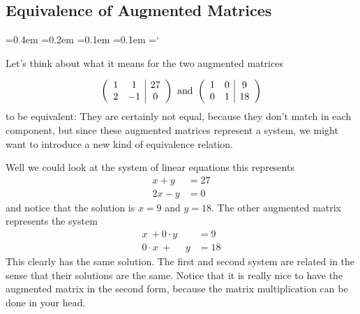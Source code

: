 \subsection*{Equivalence of Augmented Matrices}

{\ttfamily
{}\font=0.4em
\font=0.2em
\font=0.1em
\font=0.1em
\hyphenchar\font=`\-


\hypertarget{script_gaussian_elimination_background}{Let's think about what it means for the two augmented matrices} 
\[ \left( \begin{array}{cc | c}
1 & 1 & 27 \\
2 & -1 & 0  
\end{array} \right)
\mbox{ and } \left( \begin{array}{cc | c}
1 & 0 & 9 \\
0 & 1 & 18  
\end{array} \right)
\]
to be equivalent:
They are certainly not equal, because they don't match in each component, but since these augmented matrices represent a system, we might want to introduce a new kind of equivalence relation.

Well we could look at the system of linear equations this represents 
\begin{align*}
 x+y &= 27\\
 2x - y &= 0
\end{align*}
and notice that the solution is $x=9$ and $y=18$. The other augmented matrix represents the system 
\begin{align*}
 x\ +0 \cdot y &= 9\\
 0 \cdot x \ +\   \phantom{0 \cdot} y  &= 18
\end{align*}
This clearly has the same solution. The first and second system are related in the sense that their solutions are the same. Notice that it is really nice to have the augmented matrix in the second form, because the matrix multiplication can be done in your head.


}

